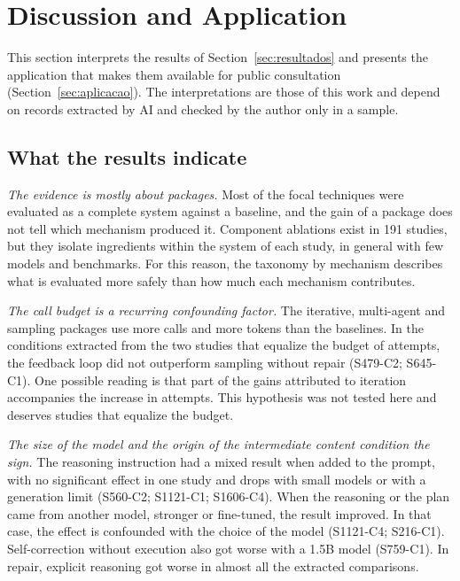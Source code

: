 \section{Discussion and Application}\label{sec:discussao}
This section interprets the results of Section~\ref{sec:resultados} and presents the application that makes them available for
public consultation (Section~\ref{sec:aplicacao}). The interpretations are those of this work and
depend on records extracted by AI and checked by the author only in a sample.

\subsection{What the results indicate}
\textit{The evidence is mostly about packages.} Most of the focal techniques were evaluated as a complete system
against a baseline, and the gain of a package does not tell which mechanism produced it. Component ablations
exist in 191 studies, but they isolate ingredients within the system of each study, in general with few models and
benchmarks. For this reason, the taxonomy by mechanism describes what is evaluated more safely than
how much each mechanism contributes.

\textit{The call budget is a recurring confounding factor.} The iterative, multi-agent and
sampling packages use more calls and more tokens than the baselines. In the conditions extracted from the two studies that equalize the
budget of attempts, the feedback loop did not outperform sampling without repair (S479-C2; S645-C1).
One possible reading is that part of the gains attributed to iteration accompanies the increase in attempts. This
hypothesis was not tested here and deserves studies that equalize the budget.

\textit{The size of the model and the origin of the intermediate content condition the sign.} The reasoning instruction
had a mixed result when added to the prompt, with no significant effect in one study and drops with small
models or with a generation limit (S560-C2; S1121-C1; S1606-C4).
When the reasoning or the plan came from another model, stronger or fine-tuned, the result improved. In that case, the
effect is confounded with the choice of the model (S1121-C4; S216-C1). Self-correction without execution also got worse with a
1.5B model (S759-C1).
In repair, explicit reasoning got worse in almost all the extracted comparisons.

